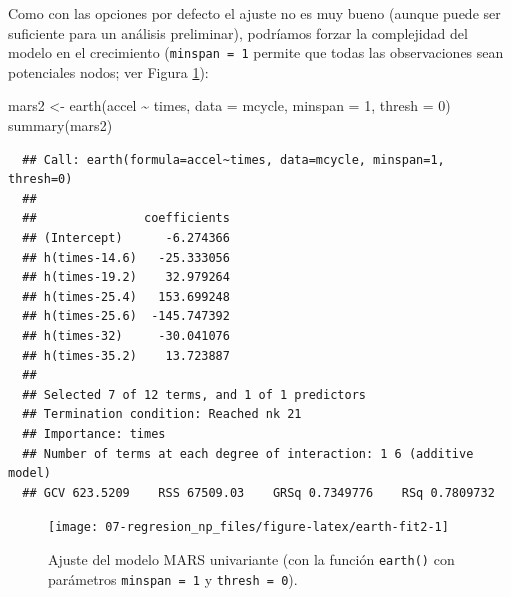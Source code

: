 \documentclass[
]{book}
\newenvironment{Shaded}{\begin{snugshade}}{\end{snugshade}}
\newcommand{\AttributeTok}[1]{\textcolor[rgb]{0.77,0.63,0.00}{#1}}
\newcommand{\DecValTok}[1]{\textcolor[rgb]{0.00,0.00,0.81}{#1}}
\newcommand{\FunctionTok}[1]{\textcolor[rgb]{0.00,0.00,0.00}{#1}}
\newcommand{\NormalTok}[1]{#1}
\newcommand{\OtherTok}[1]{\textcolor[rgb]{0.56,0.35,0.01}{#1}}
\newcommand{\SpecialCharTok}[1]{\textcolor[rgb]{0.00,0.00,0.00}{#1}}
\newcommand{\StringTok}[1]{\textcolor[rgb]{0.31,0.60,0.02}{#1}}
\theoremstyle{break}
\theoremstyle{nonumberplain}
\begin{document}
Como con las opciones por defecto el ajuste no es muy bueno (aunque puede ser suficiente para un análisis preliminar), podríamos forzar la complejidad del modelo en el crecimiento (\texttt{minspan\ =\ 1} permite que todas las observaciones sean potenciales nodos; ver Figura \ref{fig:earth-fit2}):



\begin{Shaded}
\begin{Highlighting}[]
\NormalTok{mars2 }\OtherTok{\textless{}{-}} \FunctionTok{earth}\NormalTok{(accel }\SpecialCharTok{\textasciitilde{}}\NormalTok{ times, }\AttributeTok{data =}\NormalTok{ mcycle, }\AttributeTok{minspan =} \DecValTok{1}\NormalTok{, }\AttributeTok{thresh =} \DecValTok{0}\NormalTok{)}
\FunctionTok{summary}\NormalTok{(mars2)}
\end{Highlighting}
\end{Shaded}

\begin{verbatim}
  ## Call: earth(formula=accel~times, data=mcycle, minspan=1, thresh=0)
  ## 
  ##               coefficients
  ## (Intercept)      -6.274366
  ## h(times-14.6)   -25.333056
  ## h(times-19.2)    32.979264
  ## h(times-25.4)   153.699248
  ## h(times-25.6)  -145.747392
  ## h(times-32)     -30.041076
  ## h(times-35.2)    13.723887
  ## 
  ## Selected 7 of 12 terms, and 1 of 1 predictors
  ## Termination condition: Reached nk 21
  ## Importance: times
  ## Number of terms at each degree of interaction: 1 6 (additive model)
  ## GCV 623.5209    RSS 67509.03    GRSq 0.7349776    RSq 0.7809732
\end{verbatim}

\begin{Shaded}
\end{Shaded}

\begin{figure}[!htb]

{\centering \texttt{[image: 07-regresion\_np\_files/figure-latex/earth-fit2-1]} 

}

\caption{Ajuste del modelo MARS univariante (con la función \texttt{earth()} con parámetros \texttt{minspan\ =\ 1} y \texttt{thresh\ =\ 0}).}\label{fig:earth-fit2}
\end{figure}
\end{document}
